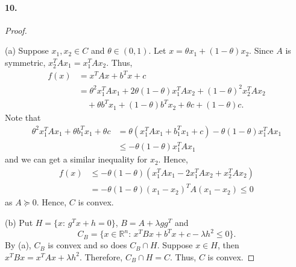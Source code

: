   \paragraph{10.}
  \begin{proof}
    $\,$\par
    (a) Suppose $x_1,x_2\in C$ and $\theta\in(0,1)$. Let $x=\theta x_1+(1-
    \theta)x_2$. Since $A$ is symmetric, $x_2^TAx_1 = x_1^TAx_2$. Thus,
    \begin{align*}
      f(x)
      &= x^TAx+b^Tx+c \\
      &=\theta^2 x_1^TAx_1+2\theta(1-\theta)x_1^TAx_2 + (1-\theta)^2x_2^TAx_2\\
      &\quad+\theta b^Tx_1 + (1-\theta)b^Tx_2 + \theta c + (1-\theta)c.
    \end{align*}
    Note that
    \begin{align*}
      \theta^2x_1^TAx_1+\theta b_1^Tx_1 + \theta c 
      &= \theta(x_1^TAx_1 + b_1^Tx_1+c) - \theta(1-\theta)x_1^TAx_1\\
      &\le -\theta(1-\theta)x_1^TAx_1
    \end{align*}
    and we can get a similar inequality for $x_2$. Hence,
    \begin{align*}
      f(x) &\le -\theta(1-\theta)(x_1^TAx_1 - 2x_1^TAx_2 + x_2^TAx_2) \\
      &= -\theta(1-\theta)(x_1-x_2)^TA(x_1-x_2) \le 0
    \end{align*}
    as $A\succeq 0$. Hence, $C$ is convex.\par
    (b) Put $H=\{x:\, g^Tx+h=0\}$, $B=A+\lambda gg^T$ and 
    \[
      C_B=\{x\in \mathbb{R}^n:\, x^TBx+b^Tx+c-\lambda h^2\le 0\}.
    \]
    By (a), $C_B$ is convex and so does $C_B\cap H$. Suppose $x\in H$, then 
    $x^TBx=x^TAx +\lambda h^2$. Therefore, $C_B\cap H=C$. Thus, $C$ is convex.
    
  \end{proof}


\iffalse





\paragraph{2.16}
\begin{proof}
  For every $(a,b_1+b_2),(c,d_1+d_2)\in S$ and $0\le\theta\le 1$, let 
  \[
    z_\theta = \theta(a,b_1+b_2)+(1-\theta)(c,d_1+d_2) = (x,y_1+y_2)
  \]
  where
  \begin{align*}
    x = \theta a+(1-\theta) c,\quad
    y_i = \theta b_i+(1-\theta)d_i\quad\text{for $i=1,2$}.
  \end{align*}
  Since $S_i$ is convex and $(a,b_i),(c,d_i)\in S_i$,
  \[
    (x,y_i)=\theta(a,b_i) + (1-\theta)(c,d_i)\in S_i.
  \]
  Hence, $S$ is convex.
\end{proof}

\fi

